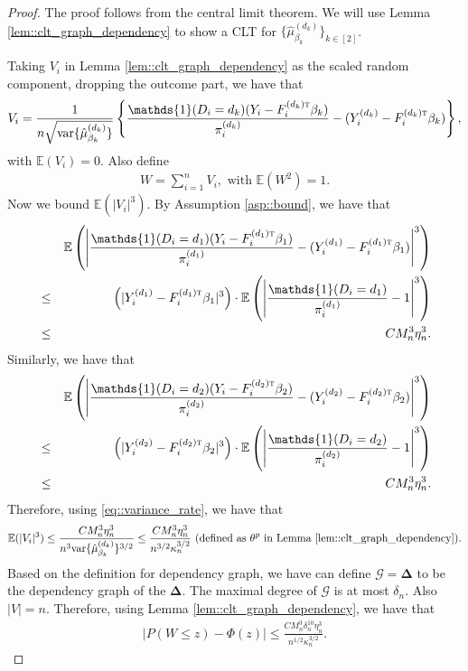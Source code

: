 \documentclass[twoside,letterpaper]{article}
\newcommand{\mathbbm}[1]{\mathds{#1}}
\theoremstyle{plain}
\theoremstyle{definition}
\theoremstyle{remark}
\newcommand{\E}{\mathbb{E}}
\def\T{{\textsc{t}}}
\newcommand{\var}{\textup{var}}
\newcommand{\bDelta}{\boldsymbol{\Delta}}
\newcommand{\indicator}{\mathbbm{1}}
\newcommand{\cG}{\mathcal{G}}
\newcommand{\sumi}{\sum_{i=1}^n}
\begin{document}
\begin{proof}
    The proof follows from the central limit theorem. We will use Lemma \ref{lem::clt_graph_dependency} to show a CLT for $\{\hat\mu^{(d_k)}_{\beta_k}\}_{k\in[2]}$. 
    
    Taking $V_i$ in Lemma \ref{lem::clt_graph_dependency} as the scaled random component, dropping the outcome part, we have that
    \begin{eqnarray*}
        V_i = \frac{1}{n\sqrt{\var\{\hat\mu^{(d_k)}_{\beta_k}\}}} \left\{\frac{\indicator(D_i=d_k)(Y_i - F_i^{(d_k)\T} \beta_k)}{\pi_i^{(d_k) } } - (Y_i^{(d_k)} - F_i^{(d_k)\T} \beta_k)\right\}, 
    \end{eqnarray*}
    with $\E(V_i) = 0$. Also define 
    \begin{eqnarray*}
        W = \sumi V_i, \text{ with } \E(W^2) = 1.
    \end{eqnarray*}
    Now we bound $\E(|V_i|^3)$. By Assumption \ref{asp::bound}, we have that
    \begin{eqnarray*}
        &&\E\left(\left|\frac{\indicator(D_i=d_1)(Y_i - F_i^{(d_1)\T} \beta_1)}{\pi_i^{(d_1) } } - (Y_i^{(d_1)} - F_i^{(d_1)\T} \beta_1)\right|^3\right) \\
        &\le& \left(|Y_i^{(d_1)} - F_i^{(d_1)\T} \beta_1|^3\right) \cdot \E\left(\left|\frac{\indicator(D_i=d_1)}{\pi_i^{(d_1)}} - 1\right|^3\right) \\
        &\le& C M_n^3 \eta_n^3.
    \end{eqnarray*}
    Similarly, we have that
    \begin{eqnarray*}
        &&\E\left(\left|\frac{\indicator(D_i=d_2)(Y_i - F_i^{(d_2)\T} \beta_2)}{\pi_i^{(d_2) } } - (Y_i^{(d_2)} - F_i^{(d_2)\T} \beta_2)\right|^3\right) \\
        &\le& \left(|Y_i^{(d_2)} - F_i^{(d_2)\T} \beta_2|^3\right) \cdot \E\left(\left|\frac{\indicator(D_i=d_2)}{\pi_i^{(d_2)}} - 1\right|^3\right) \\
        &\le& C M_n^3 \eta_n^3.
    \end{eqnarray*}
    Therefore, using \eqref{eq::variance_rate}, we have that
    \begin{eqnarray*}
        \E(|V_i|^3) \leq \frac{C M_n^3 \eta_n^3}{n^3 \var\{\hat\mu^{(d_k)}_{\beta_k}\}^{3/2}} \leq \frac{C M_n^3 \eta_n^3}{n^{3/2} \kappa_n^{3/2} } \text{ (defined as $\theta^p$ in Lemma \ref{lem::clt_graph_dependency})}.
    \end{eqnarray*}
    Based on the definition for dependency graph, we have can define $\cG = \bDelta$ to be the dependency graph of the $\bDelta$. The maximal degree of $\cG$ is at most $\delta_n$. Also $|V| = n$. Therefore, using Lemma \ref{lem::clt_graph_dependency}, we have that
    \begin{eqnarray*}
        |P(W \leq z) - \Phi(z)| \leq \frac{C M_n^3 \delta_n^{10} \eta_n^3}{n^{1/2} \kappa_n^{3/2} }. 
    \end{eqnarray*}
     
    
\end{proof}
\end{document}
